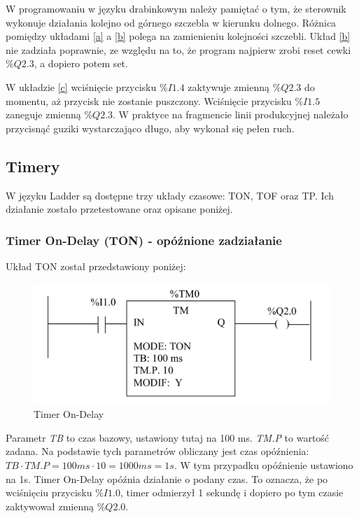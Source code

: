 \documentclass[12pt]{article}
\begin{document}
W programowaniu w języku drabinkowym należy pamiętać o tym, że sterownik wykonuje działania kolejno od górnego szczebla w kierunku dolnego. Różnica pomiędzy układami \ref{a} a \ref{b} polega na zamienieniu kolejności szczebli. Układ \ref{b} nie zadziała poprawnie, ze względu na to, że program najpierw zrobi reset cewki $\%Q2.3$, a dopiero potem set.

W układzie \ref{c} wciśnięcie przycisku $\%I1.4$ zaktywuje zmienną $\%Q2.3$ do momentu, aż przycisk nie zostanie puszczony. Wciśnięcie przycisku $\%I1.5$ zaneguje zmienną $\%Q2.3$. W praktyce na fragmencie linii produkcyjnej należało przycisnąć guziki wystarczająco długo, aby wykonał się pełen ruch.

\subsection{Timery}
W języku Ladder są dostępne trzy układy czasowe: TON, TOF oraz TP. Ich działanie zostało przetestowane oraz opisane poniżej.

\subsubsection{Timer On-Delay (TON) - opóźnione zadziałanie}

Układ TON został przedstawiony poniżej:

\begin{figure}[H]
    \centering
    \includegraphics[scale=0.25]{ton.png}
    \caption{Timer On-Delay}
\end{figure}

Parametr \textit{TB} to czas bazowy, ustawiony tutaj na 100 ms. \textit{TM.P} to wartość zadana. Na podstawie tych parametrów obliczany jest czas opóźnienia:
$ TB \cdot TM.P = 100 ms \cdot 10 = 1000 ms = 1s $. W tym przypadku opóźnienie ustawiono na 1s. Timer On-Delay opóźnia działanie o podany czas. To oznacza, że po wciśnięciu przycisku $\%I1.0$, timer odmierzył 1 sekundę i dopiero po tym czasie zaktywował zmienną $\%Q2.0$.
\end{document}
